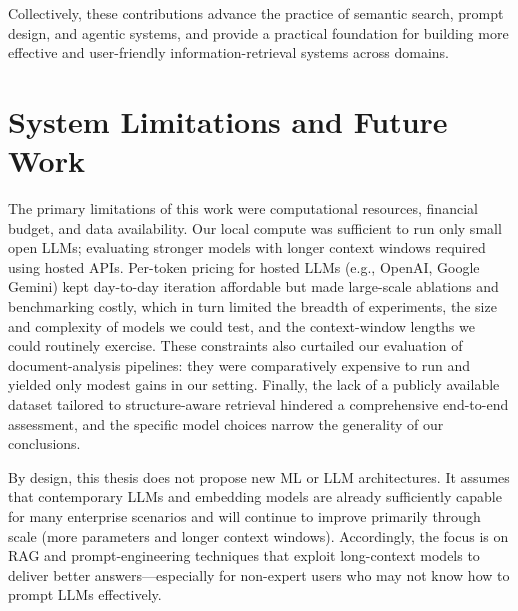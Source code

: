 Collectively, these contributions advance the practice of semantic search, prompt design, and agentic systems, and provide a practical foundation for building more effective and user-friendly information-retrieval systems across domains.
\section{System Limitations and Future Work}
The primary limitations of this work were computational resources, financial budget, and data availability. Our local compute was sufficient to run only small open \glspl{LLM}; evaluating stronger models with longer context windows required using hosted APIs. Per-token pricing for hosted \glspl{LLM} (e.g., OpenAI, Google Gemini) kept day-to-day iteration affordable but made large-scale ablations and benchmarking costly, which in turn limited the breadth of experiments, the size and complexity of models we could test, and the context-window lengths we could routinely exercise. These constraints also curtailed our evaluation of document-analysis pipelines: they were comparatively expensive to run and yielded only modest gains in our setting. Finally, the lack of a publicly available dataset tailored to structure-aware retrieval hindered a comprehensive end-to-end assessment, and the specific model choices narrow the generality of our conclusions.

By design, this thesis does not propose new \gls{ML} or \gls{LLM} architectures. It assumes that contemporary \glspl{LLM} and embedding models are already sufficiently capable for many enterprise scenarios and will continue to improve primarily through scale (more parameters and longer context windows). Accordingly, the focus is on \gls{RAG} and prompt-engineering techniques that exploit long-context models to deliver better answers—especially for non-expert users who may not know how to prompt \glspl{LLM} effectively.

